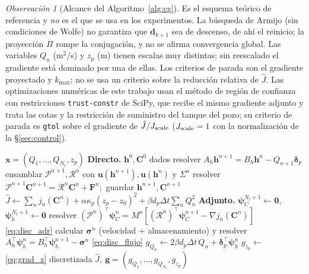 \documentclass[11pt]{article}
\numberwithin{equation}{section}
\theoremstyle{plain}
\theoremstyle{definition}
\theoremstyle{remark}
\newtheorem*{remark}{Observación}
\newcommand{\bu}{\mathbf{u}}
\begin{document}
\begin{remark}[Alcance del Algoritmo~\ref{alg:cg}]
Es el esquema teórico de referencia y \emph{no} es el que se usa en los experimentos. La búsqueda de Armijo (sin condiciones de Wolfe) no garantiza que $\mathbf{d}_{k+1}$ sea de descenso, de ahí el reinicio; la proyección
$\Pi$ rompe la conjugación, y no se afirma convergencia global. Las variables $Q_n$ (m$^2$/s) y $z_p$ (m) tienen escalas muy distintas; sin reescalado el gradiente está dominado por una de ellas. Los criterios de parada son el gradiente proyectado y $k_{\max}$;
no se usa un criterio sobre la reducción relativa de $\hat J$.
Las optimizaciones numéricas de este trabajo usan el método de región de confianza con restricciones \texttt{trust-constr} de SciPy, que recibe el mismo gradiente adjunto y trata las cotas y la restricción de suministro del tanque del pozo; su
criterio de parada es \texttt{gtol} sobre el gradiente de $\hat J/J_{\rm scale}$ ($J_{\rm scale}=1$ con la normalización de la \S\ref{sec:control}).
\end{remark}

\begin{algorithm}[h]
\caption{\textsc{EvalJG} para ADR}
\label{alg:adr}
\begin{algorithmic}[1]
\Require $\mathbf{x}=(Q_1,\dots,Q_{N_t},z_p)$
\State \textbf{Directo.} $\mathbf{h}^0,\mathbf{C}^0$ dados
  \State resolver $A_h\mathbf{h}^{n+1}=B_h\mathbf{h}^n-Q_{n+1}\boldsymbol\delta_p$
  \State ensamblar $\mathcal{P}^{n+1},\mathcal{R}^n$ con $\bu(\mathbf{h}^{n+1}),\bu(\mathbf{h}^n)$ y $\Sigma^n$
  \State resolver $\mathcal{P}^{n+1}\mathbf{C}^{n+1}=\mathcal{R}^n\mathbf{C}^n+\mathbf{F}^n$;\ guardar $\mathbf{h}^{n+1},\mathbf{C}^{n+1}$
\EndFor
\State $\hat J\gets\sum_n j_n(\mathbf{C}^n)+\alpha\kappa_p(z_p-z_0)^2+\beta d_p\Delta t\sum_nQ_n^2$
\State \textbf{Adjunto.} $\boldsymbol\psi_C^{N_t+1}\gets\mathbf{0}$,\ $\boldsymbol\psi_h^{N_t+1}\gets\mathbf{0}$
  \State resolver $(\mathcal{P}^{n})^\top\boldsymbol\psi_C^{n}=M^n[(\mathcal{R}^{n})^\top\boldsymbol\psi_C^{n+1}-\nabla j_n(\mathbf{C}^n)]$ \hfill \eqref{eq:disc_adr}
  \State calcular $\boldsymbol\sigma^{n}$ (velocidad $+$ almacenamiento) y resolver
         $A_h^\top\boldsymbol\psi_h^{n}=B_h^\top\boldsymbol\psi_h^{n+1}-\boldsymbol\sigma^{n}$ \hfill \eqref{eq:disc_flujo}
  \State $g_{Q_n}\gets2\beta d_p\Delta t\,Q_n+\boldsymbol\delta_p^\top\boldsymbol\psi_h^{n}$
\EndFor
\State $g_{z_p}\gets$ \eqref{eq:grad_z} discretizada
\State \Return $\hat J,\ \mathbf{g}=(g_{Q_1},\dots,g_{Q_{N_t}},g_{z_p})$
\end{algorithmic}
\end{algorithm}
\end{document}
